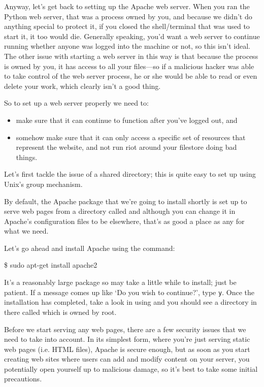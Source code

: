 Anyway, let's get back to setting up the Apache web server. When you ran the Python web server, that was a process owned by you, and because we didn't do anything special to protect it, if you closed the shell/terminal that was used to start it, it too would die. Generally speaking, you'd want a web server to continue running whether anyone was logged into the machine or not, so this isn't ideal. The other issue with starting a web server in this way is that because the process is owned by you, it has access to all your files---so if a malicious hacker was able to take control of the web server process, he or she would be able to read or even delete your work, which clearly isn't a good thing.

So to set up a web server properly we need to:

\begin{itemize}
\item make sure that it can continue to function after you've logged out, and
\item somehow make sure that it can only access a specific set of resources that represent the website, and not run riot around your filestore doing bad things.
\end{itemize}

Let's first tackle the issue of a shared directory; this is quite easy to set up using Unix's group mechanism.

By default, the Apache package that we're going to install shortly is set up to serve web pages from a directory called  and although you can change it in Apache's configuration files to be elsewhere, that's as good a place as any for what we need.

Let's go ahead and install Apache using the command:

\begin{ttoutenv}
\$ sudo apt-get install apache2
\end{ttoutenv}

It's a reasonably large package so may take a little while to install;
just be patient. If a message comes up like `Do you wish to
continue?', type \verb+y+. Once the installation has completed, take a
look in  using  and you should see a
directory in there called  which is owned by root.

Before we start serving any web pages, there are a few security issues
that we need to take into account. In its simplest form, where you're
just serving static web pages (i.e. HTML files), Apache is secure
enough, but as soon as you start creating web sites where users can
add and modify content on your server, you potentially open yourself
up to malicious damage, so it's best to take some initial precautions.

